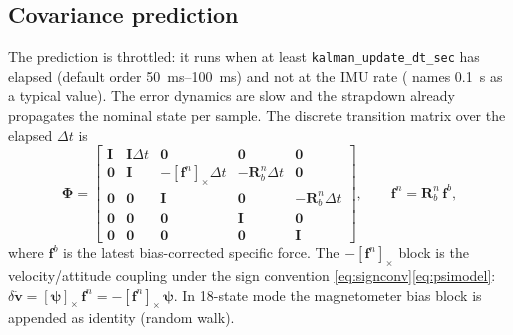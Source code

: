 \documentclass[11pt,a4paper]{article}
\newcommand{\vect}[1]{\bm{#1}}
\newcommand{\mat}[1]{\bm{#1}}
\newcommand{\cross}[1]{\left[#1\right]_{\times}}   %
\newcommand{\nframe}{n}
\newcommand{\bframe}{b}
\newcommand{\Rbn}{\mat{R}_{\bframe}^{\nframe}}
\newcommand{\dt}{\Delta t}
\newcommand{\code}[1]{\texttt{#1}}
\begin{document}
\subsection{Covariance prediction}
\label{sec:predict}

The prediction is throttled: it runs when at least
\code{kalman\_\allowbreak{}update\_\allowbreak{}dt\_\allowbreak{}sec} has elapsed (default order
\SIrange{50}{100}{\milli\second}) and not at the IMU rate (\cite{wendel2011}
names \SI{0.1}{\second} as a typical value). The error dynamics
are slow and the strapdown already propagates the nominal state per
sample. The discrete transition matrix over the elapsed $\dt$ is
\cite[eq.~10.1]{wendel2011}
\begin{equation}
  \mat{\Phi} =
  \begin{bmatrix}
    \mat{I} & \mat{I}\dt & \mat{0} & \mat{0} & \mat{0} \\
    \mat{0} & \mat{I} & -\cross{\vect{f}^\nframe}\dt & -\Rbn\dt & \mat{0} \\
    \mat{0} & \mat{0} & \mat{I} & \mat{0} & -\Rbn\dt \\
    \mat{0} & \mat{0} & \mat{0} & \mat{I} & \mat{0} \\
    \mat{0} & \mat{0} & \mat{0} & \mat{0} & \mat{I}
  \end{bmatrix},
  \qquad
  \vect{f}^\nframe = \Rbn\,\vect{f}^\bframe ,
  \label{eq:phi}
\end{equation}
where $\vect{f}^\bframe$ is the latest bias-corrected specific force.
The $-\cross{\vect{f}^\nframe}$ block is the velocity/attitude coupling
under the sign convention \eqref{eq:signconv}\eqref{eq:psimodel}:
$\delta\dot{\vect{v}} = \cross{\vect{\psi}}\,\vect{f}^\nframe
= -\cross{\vect{f}^\nframe}\,\vect{\psi}$. In 18-state mode the
magnetometer bias block is appended as identity (random walk).
\end{document}
